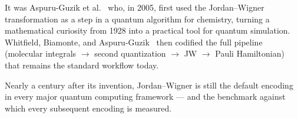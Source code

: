 \documentclass[11pt,a4paper]{article}
\theoremstyle{definition}
\begin{document}
It was Aspuru-Guzik et al.~\cite{aspuruguzik2005} who, in 2005,
first used the Jordan--Wigner transformation as a step in a quantum
algorithm for chemistry, turning a mathematical curiosity from 1928
into a practical tool for quantum simulation.  Whitfield, Biamonte, and
Aspuru-Guzik~\cite{whitfield2011} then codified the full pipeline
(molecular integrals $\to$ second quantization $\to$ JW $\to$ Pauli
Hamiltonian) that remains the standard workflow today.

Nearly a century after its invention, Jordan--Wigner is still the
default encoding in every major quantum computing framework --- and
the benchmark against which every subsequent encoding is measured.



\end{document}
